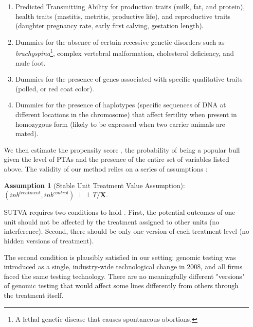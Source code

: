 \documentclass[12pt,letterpaper]{article}
\begin{document}
\begin{enumerate}
    \item Predicted Transmitting Ability for production traits (milk, fat, and protein), health traits (mastitis, metritis, productive life), and reproductive traits (daughter pregnancy rate, early first calving, gestation length).
    \item Dummies for the absence of certain recessive genetic disorders \citep{sire_workbbok2021} such as \textit{brachyspina}\footnote{A lethal genetic disease that causes spontaneous abortions.}, complex vertebral malformation, cholesterol deficiency, and mule foot.
    \item Dummies for the presence of genes associated with specific qualitative traits (polled, or red coat color).
    \item Dummies for the presence of haplotypes (specific sequences of DNA at different locations in the chromosome) that affect fertility \citep{haplotypes2018} when present in homozygous form (likely to be expressed when two carrier animals are mated).
\end{enumerate}

We then estimate the propensity score \citep[p.~873]{Cameron_Trivedi2005}, the probability of being a popular bull given the level of PTAs and the presence of the entire set of variables listed above. The validity of our method relies on a series of assumptions \citep{Heckman1997}:

\medskip
\textbf{Assumption 1} (Stable Unit Treatment Value Assumption): $(inb^{treatment}, inb^{control}) \perp\!\!\!\perp T/\mathbf{X}$.

SUTVA requires two conditions to hold \citep{Imbens2015}. First, the potential outcomes of one unit should not be affected by the treatment assigned to other units (no interference). Second, there should be only one version of each treatment level (no hidden versions of treatment).

The second condition is plausibly satisfied in our setting: genomic testing was introduced as a single, industry-wide technological change in 2008, and all firms faced the same testing technology. There are no meaningfully different "versions" of genomic testing that would affect some lines differently from others through the treatment itself.
\end{document}

